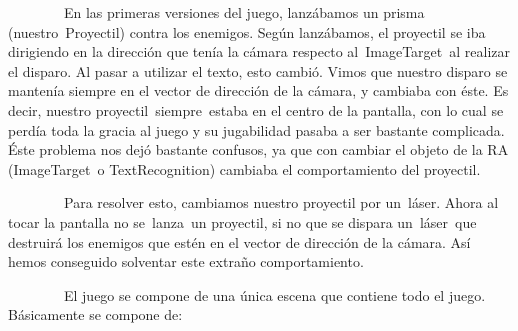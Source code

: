 ~~~~~~~~En las primeras versiones del juego, lanzábamos un prisma
(nuestro~Proyectil) contra los enemigos. Según lanzábamos, el proyectil
se iba dirigiendo en la dirección que tenía la cámara respecto
al~ImageTarget~al realizar el disparo. Al pasar a utilizar el texto,
esto cambió. Vimos que nuestro disparo se mantenía siempre en el vector
de dirección de la cámara, y cambiaba con éste. Es decir, nuestro
proyectil~siempre~estaba en el centro de la pantalla, con lo cual se
perdía toda la gracia al juego y su jugabilidad pasaba a ser bastante
complicada. Éste problema nos dejó bastante confusos, ya que con cambiar
el objeto de la RA (ImageTarget~o TextRecognition) cambiaba el
comportamiento del proyectil.

~~~~~~~~Para resolver esto, cambiamos nuestro proyectil por un~láser.
Ahora al tocar la pantalla no se~lanza~un proyectil, si no que se
dispara un~láser~que destruirá los enemigos que estén en el vector de
dirección de la cámara. Así hemos conseguido solventar este extraño
comportamiento.


~~~~~~~~El juego se compone de una única escena que contiene todo el
juego. Básicamente se compone de:

